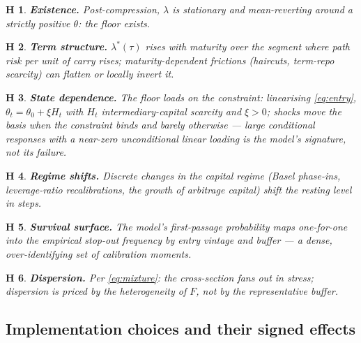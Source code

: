 \documentclass[11pt]{article}
\newtheorem{hypothesis}{H}
\begin{document}
\begin{hypothesis}\textbf{Existence.} Post-compression, $\lambda$ is stationary and mean-reverting around a strictly positive $\theta$: the floor exists.\end{hypothesis}
\begin{hypothesis}\textbf{Term structure.} $\lambda^*(\tau)$ rises with maturity over the segment where path risk per unit of carry rises; maturity-dependent frictions (haircuts, term-repo scarcity) can flatten or locally invert it.\end{hypothesis}
\begin{hypothesis}\textbf{State dependence.} The floor loads on the \emph{constraint}: linearising \eqref{eq:entry}, $\theta_t=\theta_0+\xi H_t$ with $H_t$ intermediary-capital scarcity and $\xi>0$; shocks move the basis \emph{when the constraint binds} and barely otherwise --- large conditional responses with a near-zero unconditional linear loading is the model's signature, not its failure.\end{hypothesis}
\begin{hypothesis}\textbf{Regime shifts.} Discrete changes in the capital regime (Basel phase-ins, leverage-ratio recalibrations, the growth of arbitrage capital) shift the resting level in steps.\end{hypothesis}
\begin{hypothesis}\textbf{Survival surface.} The model's first-passage probability maps one-for-one into the empirical stop-out frequency by entry vintage and buffer --- a dense, over-identifying set of calibration moments.\end{hypothesis}
\begin{hypothesis}\textbf{Dispersion.} Per \eqref{eq:mixture}: the cross-section fans out in stress; dispersion is priced by the heterogeneity of $F$, not by the representative buffer.\end{hypothesis}

\subsection{Implementation choices and their signed effects}
\end{document}
